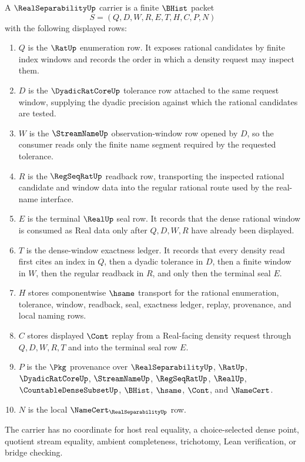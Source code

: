 \begin{definition}
\label{def:real-separability-carrier}
A $\RealSeparabilityUp$ carrier is a finite $\BHist$ packet
$$
S=(Q,D,W,R,E,T,H,C,P,N)
$$
with the following displayed rows:
\begin{enumerate}
\item $Q$ is the $\RatUp$ enumeration row. It exposes rational candidates by finite index windows and records the order in which a density request may inspect them.
\item $D$ is the $\DyadicRatCoreUp$ tolerance row attached to the same request window, supplying the dyadic precision against which the rational candidates are tested.
\item $W$ is the $\StreamNameUp$ observation-window row opened by $D$, so the consumer reads only the finite name segment required by the requested tolerance.
\item $R$ is the $\RegSeqRatUp$ readback row, transporting the inspected rational candidate and window data into the regular rational route used by the real-name interface.
\item $E$ is the terminal $\RealUp$ seal row. It records that the dense rational window is consumed as Real data only after $Q,D,W,R$ have already been displayed.
\item $T$ is the dense-window exactness ledger. It records that every density read first cites an index in $Q$, then a dyadic tolerance in $D$, then a finite window in $W$, then the regular readback in $R$, and only then the terminal seal $E$.
\item $H$ stores componentwise $\hsame$ transport for the rational enumeration, tolerance, window, readback, seal, exactness ledger, replay, provenance, and local naming rows.
\item $C$ stores displayed $\Cont$ replay from a Real-facing density request through $Q,D,W,R,T$ and into the terminal seal row $E$.
\item $P$ is the $\Pkg$ provenance over $\RealSeparabilityUp$, $\RatUp$, $\DyadicRatCoreUp$, $\StreamNameUp$, $\RegSeqRatUp$, $\RealUp$, $\CountableDenseSubsetUp$, $\BHist$, $\hsame$, $\Cont$, and $\NameCert$.
\item $N$ is the local $\NameCert_{\RealSeparabilityUp}$ row.
\end{enumerate}
The carrier has no coordinate for host real equality, a choice-selected dense point, quotient stream equality, ambient completeness, trichotomy, Lean verification, or bridge checking.
\end{definition}

